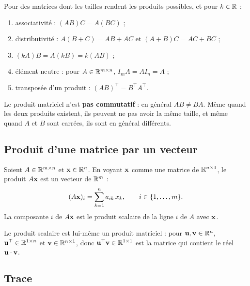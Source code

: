 \begin{proposition}
Pour des matrices dont les tailles rendent les
produits possibles, et pour $k \in \mathbb{R}$ :
\begin{enumerate}
    \item associativité : $(AB)C = A(BC)$ ;
    \item distributivité : $A(B + C) = AB + AC$ et
          $(A + B)C = AC + BC$ ;
    \item $(kA)B = A(kB) = k(AB)$ ;
    \item élément neutre : pour
          $A \in \mathbb{R}^{m \times n}$,
          $I_m A = A I_n = A$ ;
    \item transposée d'un produit :
          $(AB)^\top = B^\top A^\top$.
\end{enumerate}
\end{proposition}

\begin{importantbox}
Le produit matriciel n'est \textbf{pas commutatif} :
en général $AB \neq BA$. Même quand les deux
produits existent, ils peuvent ne pas avoir la même
taille, et même quand $A$ et $B$ sont carrées, ils
sont en général différents.
\end{importantbox}

\subsection{Produit d'une matrice par un vecteur}

\begin{definition}
\label{def-matrice-vecteur}
Soient $A \in \mathbb{R}^{m \times n}$ et $\mathbf{x} \in \mathbb{R}^n$.
En voyant $\mathbf{x}$ comme une matrice de
$\mathbb{R}^{n \times 1}$, le produit $A\mathbf{x}$ est un
vecteur de $\mathbb{R}^m$ :
\[
    (A\mathbf{x})_i = \sum_{k=1}^{n} a_{ik}\, x_k,
    \qquad i \in \{1, \dots, m\}.
\]
La composante $i$ de $A\mathbf{x}$ est le produit
scalaire de la ligne $i$ de $A$ avec $\mathbf{x}$.
\end{definition}

\begin{remark}
Le produit scalaire est lui-même un produit
matriciel : pour $\mathbf{u}, \mathbf{v} \in \mathbb{R}^n$,
$\mathbf{u}^\top \in \mathbb{R}^{1 \times n}$ et
$\mathbf{v} \in \mathbb{R}^{n \times 1}$, donc
$\mathbf{u}^\top \mathbf{v} \in \mathbb{R}^{1 \times 1}$ est la
matrice qui contient le réel
$\mathbf{u} \cdot \mathbf{v}$.
\end{remark}

\subsection{Trace}

